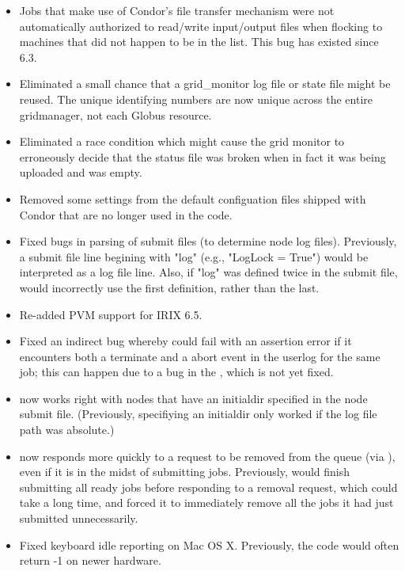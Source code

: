 \begin{itemize}

\item Jobs that make use of Condor's file transfer mechanism were not
automatically authorized to read/write input/output files when
flocking to machines that did not happen to be in the
 list.  This bug has existed since 6.3.

\item Eliminated a small chance that a grid\_monitor log file or state file
    might be reused.  The unique identifying numbers are now unique across
	the entire gridmanager, not each Globus resource.

\item Eliminated a race condition which might cause the grid monitor to
	erroneously decide that the status file was broken when in fact it
	was being uploaded and was empty.

\item Removed some settings from the default configuation files
  shipped with Condor that are no longer used in the code.

\item Fixed bugs in  parsing of submit files (to determine
  node log files).  Previously, a submit file line begining with
  "log" (e.g., "LogLock = True") would be interpreted as a log file
  line.  Also, if "log" was defined twice in the submit file,
   would incorrectly use the first definition, rather than
  the last.

\item Re-added PVM support for IRIX 6.5.

\item Fixed an indirect bug whereby  could fail with an
assertion error if it encounters both a terminate and a abort event in
the userlog for the same job; this can happen due to a bug in the
, which is not yet fixed.

\item {} now works right with nodes that have an initialdir
  specified in the node submit file.  (Previously, specifiying
  an initialdir only worked if the log file path was absolute.)

\item {} now responds more quickly to a request to be
      removed from the queue (via ), even if it is in the
      midst of submitting jobs.  Previously,  would
      finish submitting all ready jobs before responding to a removal
      request, which could take a long time, and forced it to
      immediately remove all the jobs it had just submitted
      unnecessarily.

\item Fixed keyboard idle reporting on Mac OS X. Previously, the code
      would often return -1 on newer hardware. 

\end{itemize}

